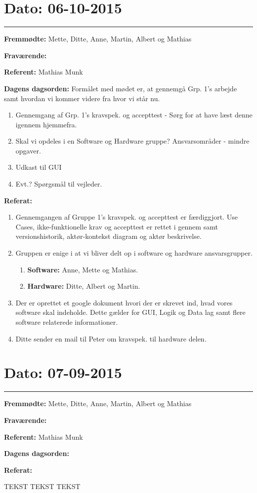\section{Dato: 06-10-2015}
\hrule

\textbf{Fremmødte:} Mette, Ditte, Anne, Martin, Albert og Mathias 

\textbf{Fraværende:}

\textbf{Referent:} Mathias Munk

\textbf{Dagens dagsorden:}
\newline
Formålet med mødet er, at gennemgå Grp. 1's arbejde samt hvordan vi kommer videre fra hvor vi står nu.
\begin{enumerate}
\item Gennemgang af Grp. 1's kravspek. og accepttest - Sørg for at have læst denne igennem hjemmefra.

\item Skal vi opdeles i en Software og Hardware gruppe? Ansvarsområder - mindre opgaver.

\item Udkast til GUI

\item Evt.? Spørgsmål til vejleder.
\end{enumerate}

\textbf{Referat:}
\newline 
\begin{enumerate}
\item Gennemgangen af Gruppe 1's kravspek. og accepttest er færdiggjort. Use Cases, ikke-funktionelle krav og accepttest er rettet i gennem samt versionshistorik, aktør-kontekst diagram og aktør beskrivelse. 
\item Gruppen er enige i at vi bliver delt op i	software og hardware ansvarsgrupper.
\begin{enumerate}
\item \textbf{Software: } Anne, Mette og Mathias.
\item \textbf{Hardware: } Ditte, Albert og Martin.
\end{enumerate}
\item Der er oprettet et google dokument hvori der er skrevet ind, hvad vores software skal indeholde. Dette gælder for GUI, Logik og Data lag samt flere software relaterede informationer.
\item Ditte sender en mail til Peter om kravspek. til hardware delen.
\end{enumerate}

\section{Dato: 07-09-2015}
\hrule

\textbf{Fremmødte:} Mette, Ditte, Anne, Martin, Albert og Mathias 

\textbf{Fraværende:}

\textbf{Referent:} Mathias Munk

\textbf{Dagens dagsorden:}
\newline

\textbf{Referat:}
\newline 

TEKST TEKST TEKST